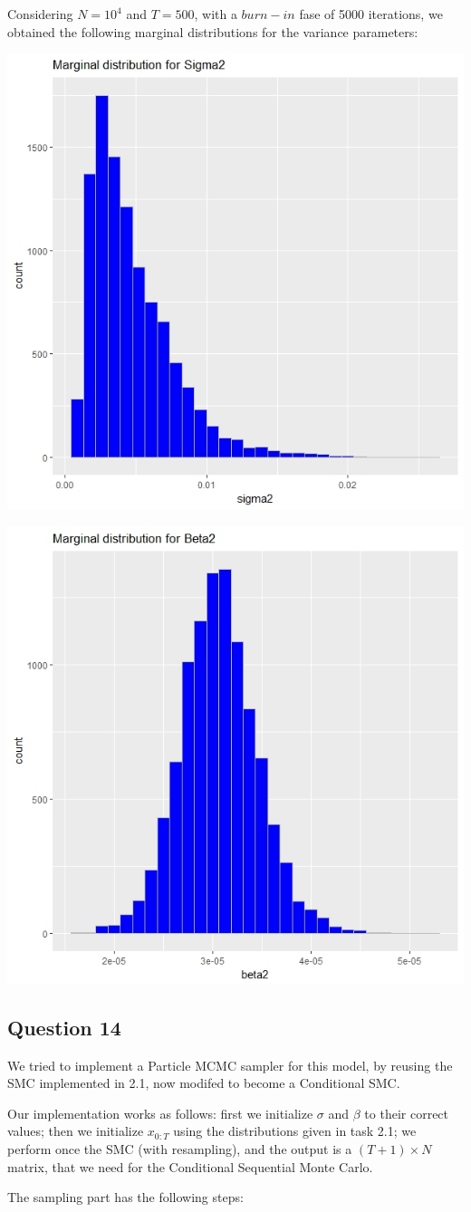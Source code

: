 \documentclass[]{article}
\begin{document}
	
	Considering $N=10^4$ and $T=500$, with a $burn-in$ fase of 5000 iterations, we obtained the following marginal distributions for the variance parameters:
	
	\begin{center}
		
		\includegraphics[width=.4\textwidth]{task5/Gibbs_sigma2.jpeg}
		
		\includegraphics[width=.4\textwidth]{task5/Gibbs_beta2.jpeg}
		
	\end{center}
	
	
	
	\subsection*{Question 14}
	
	We tried to implement a Particle MCMC sampler for this model, by reusing the SMC implemented in 2.1, now modifed to become a Conditional SMC. 
	
	
	Our implementation works as follows: first we initialize $\sigma$ and $\beta$ to their correct values; then we initialize $x_{0:T}$ using the distributions given in task 2.1; we perform once the SMC (with resampling), and the output is a $(T+1) \times N$ matrix, that we need for the Conditional Sequential Monte Carlo.
	
	
	The sampling part has the following steps:
	
\end{document}
